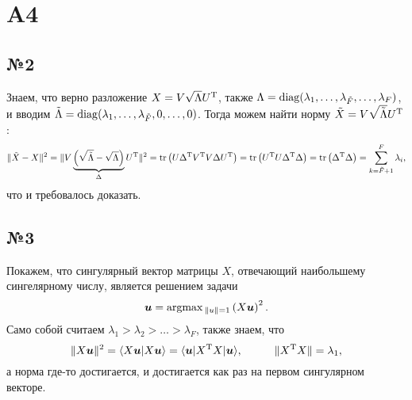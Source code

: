 \newpage

\section{A4}






\subsection*{№2}

Знаем, что верно разложение $X = V \sqrt{\Lambda} U^{\text{T}}$, также $\Lambda = \mathop{\mathrm{diag}}\nolimits(\lambda_1, \ldots, \lambda_{\tilde{F}}, \ldots, \lambda_F)$, и вводим $\tilde{\Lambda} = \mathop{\mathrm{diag}}\nolimits(\lambda_1,\ldots,\lambda_{\tilde{F}},0,\ldots,0)$. Тогда можем найти норму $\tilde{X} = V \sqrt{\tilde{\Lambda}} U^{\text{T}}$:
\begin{equation*}
    \|\tilde{X} - X\|^2 = \|
        V \underbrace{\left(
            \sqrt{\tilde{\Lambda}} - \sqrt{\Lambda}
        \right)}_{\Delta} U^{\text{T}}
    \|^2   = \mathop{\mathrm{tr}}\nolimits \left(
        U \Delta^{\text{T}} V^{\text{T}} V \Delta U^{\text{T}} 
    \right) = \mathop{\mathrm{tr}}\nolimits\left(
        U^{\text{T}} U \Delta^{\text{T}} \Delta
    \right) = \mathop{\mathrm{tr}}\nolimits\left(\Delta^{\text{T}} \Delta\right) = \sum_{k=\tilde{F}+1}^{F}  \lambda_i,
\end{equation*}
что и требовалось доказать.




\subsection*{№3}

Покажем, что сингулярный вектор матрицы $X$, отвечающий наибольшему сингелярному числу, является решением задачи
\begin{equation*}
    \mbox{\boldmath $u$} = \text{argmax}\,_{\|u\|=1} \left(X \mbox{\boldmath $u$}\right)^2.
\end{equation*}
Само собой считаем $\lambda_1 > \lambda_2 > \ldots > \lambda_F$, также знаем, что
\begin{equation*}
    \|X \vc{u}\|^2 = \langle X \vc{u} | X \vc{u} \rangle = \langle \vc{u}| X\T X| \vc{u}\rangle,
    \hspace{10 mm} 
    \|X\T X\| = \lambda_1, 
\end{equation*}
а норма где-то достигается, и достигается как раз на первом сингулярном векторе.

